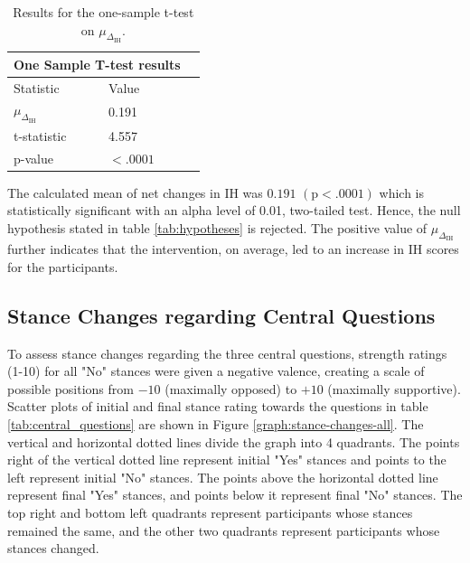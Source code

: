 \documentclass{scrartcl}
\begin{document}
\begin{table}[ht]
    \centering
    \begin{tabular}{llr}
\hline
\multicolumn{2}{c}{\textbf{One Sample T-test results}} \\
\hline
Statistic    & Value \\
\hline
$\mu_{\Delta_\text{IH}}$  & 0.191 \\
t-statistic & 4.557 \\
p-value &  $<.0001$ \\

\hline
\end{tabular}
    \caption{Results for the one-sample t-test on $\mu_{\Delta_\text{IH}}$.}
    \label{tab:ttest-results}
\end{table}

The calculated mean of net changes in IH was $0.191$ $(\text{p}<.0001)$ which is statistically significant with an alpha level of 0.01, two-tailed test. Hence, the null hypothesis stated in table \ref{tab:hypotheses} is rejected. The positive value of $\mu_{\Delta_\text{IH}}$ further indicates that the intervention, on average, led to an increase in IH scores for the participants.

\subsection{Stance Changes regarding Central Questions}
To assess stance changes regarding the three central questions, strength ratings (1-10) for all "No" stances were given a negative valence, creating a scale of possible positions from $-10$ (maximally opposed) to $+10$ (maximally supportive). Scatter plots of initial and final stance rating towards the questions in table \ref{tab:central_questions} are shown in Figure \ref{graph:stance-changes-all}. The vertical and horizontal dotted lines divide the graph into 4 quadrants. The points right of the vertical dotted line represent initial "Yes" stances and points to the left represent initial "No" stances. The points above the horizontal dotted line represent final "Yes" stances, and points below it represent final "No" stances. The top right and bottom left quadrants represent participants whose stances remained the same, and the other two quadrants represent participants whose stances changed.
\end{document}
